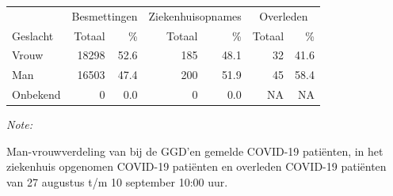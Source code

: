 \documentclass[
  english,
  man,floatsintext]{apa6}
\begin{document}
\begin{table}
\centering\begingroup\fontsize{11}{13}\selectfont

\begin{threeparttable}
\begin{tabular}{lrrrrrr}
\toprule
\multicolumn{1}{c}{ } & \multicolumn{2}{c}{Besmettingen} & \multicolumn{2}{c}{Ziekenhuisopnames} & \multicolumn{2}{c}{Overleden} \\
\cmidrule(l{3pt}r{3pt}){2-3} \cmidrule(l{3pt}r{3pt}){4-5} \cmidrule(l{3pt}r{3pt}){6-7}
Geslacht & Totaal & \% & Totaal & \% & Totaal & \%\\
\midrule
Vrouw & 18298 & 52.6 & 185 & 48.1 & 32 & 41.6\\
Man & 16503 & 47.4 & 200 & 51.9 & 45 & 58.4\\
Onbekend & 0 & 0.0 & 0 & 0.0 & NA & NA\\
\bottomrule
\end{tabular}
\begin{tablenotes}
\item \textit{Note: } 
\item Man-vrouwverdeling van bij de GGD’en gemelde COVID-19 patiënten, in het ziekenhuis opgenomen COVID-19 patiënten en overleden COVID-19 patiënten van 27 augustus t/m 10 september 10:00 uur.
\end{tablenotes}
\end{threeparttable}
\endgroup{}
\end{table}
\newpage
\end{document}
